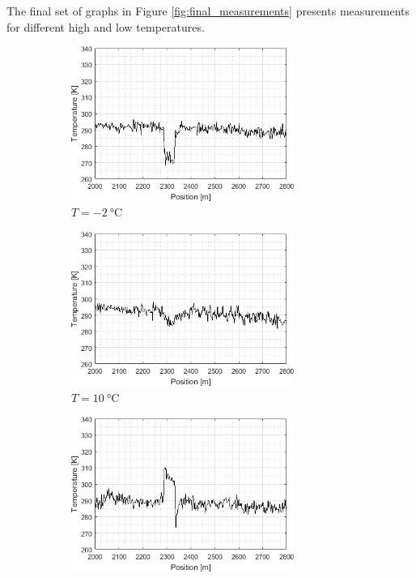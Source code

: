 \documentclass{standalone}
\begin{document}
The final set of graphs in Figure \ref{fig:final_measurements} presents measurements for different high and low temperatures.
\begin{landscape}
	\begin{figure}[h]
		\centering
		\begin{subfigure}[b]{0.49\linewidth}
			\centering
			\includegraphics[width=0.8\textwidth]{final_measurements_-2c.png}
			\caption{$T = \SI{-2}{\celsius}$}
			\vspace{1em}
		\end{subfigure}
		\begin{subfigure}[b]{0.49\linewidth}
			\centering
			\includegraphics[width=0.8\textwidth]{final_measurements_10c.png}
			\caption{$T = \SI{10}{\celsius}$}
			\vspace{1em}
		\end{subfigure}
		\begin{subfigure}[b]{0.49\linewidth}
			\centering
			\includegraphics[width=0.8\textwidth]{final_measurements_40c.png}

\end{subfigure}
\end{figure}
\end{landscape}
\end{document}

